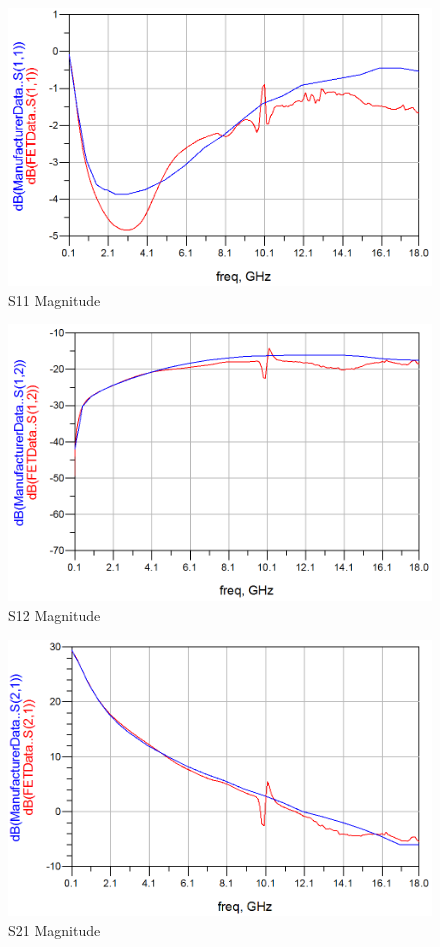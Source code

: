 \documentclass[conference]{IEEEtran}
\begin{document}
\begin{figure}[!h]
\centering
\includegraphics[scale=0.3]{pics/S11Magnitude.png}
\caption{S11 Magnitude}
\label{fig:s11mag}
\end{figure}

\begin{figure}[!h]
\centering
\includegraphics[scale=0.3]{pics/S12Magnitude.png}
\caption{S12 Magnitude}
\label{fig:s12mag}
\end{figure}

\begin{figure}[!h]
\centering
\includegraphics[scale=0.3]{pics/S21Magnitude.png}
\caption{S21 Magnitude}
\label{fig:s21mag}
\end{figure}
\end{document}

